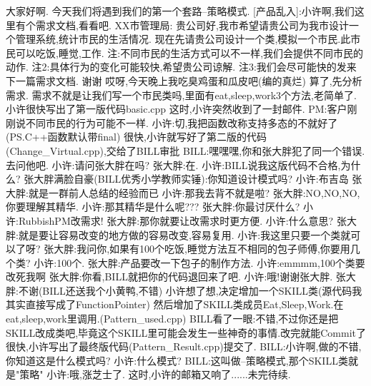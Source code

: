 \documentclass{ctexart}
\def\enter{{\hfill\break}}
\begin{document}
\enter
大家好啊.\enter
今天我们将遇到我们的第一个套路--策略模式.\enter
\enter
[产品乱入]:小许啊,我们这里有个需求文档,看看吧.
\enter
XX市管理局:\enter
贵公司好,我市希望请贵公司为我市设计一个管理系统,统计市民的生活情况.\enter
现在先请贵公司设计一个类,模拟一个市民.此市民可以吃饭,睡觉,工作.\enter
注:不同市民的生活方式可以不一样,我们会提供不同市民的动作.\enter
注2:具体行为的变化可能较快,希望贵公司谅解.\enter
注3:我们会尽可能快的发来下一篇需求文档.\enter
\enter
谢谢\enter
\enter
哎呀,今天晚上我吃臭鸡蛋和瓜皮吧(编的真烂)\enter
\enter
算了,先分析需求.\enter
\enter
需求不就是让我们写一个市民类吗,里面有eat,sleep,work3个方法,老简单了.\enter
小许很快写出了第一版代码basic.cpp\enter
\enter
这时,小许突然收到了一封邮件.\enter
\enter
PM:客户刚刚说不同市民的行为可能不一样.\enter
\enter
小许:切,我把函数改称支持多态的不就好了(PS.C++函数默认带final)\enter
很快,小许就写好了第二版的代码(Change\_Virtual.cpp),交给了BILL审批\enter
BILL:嘿嘿嘿,你和张大胖犯了同一个错误.去问他吧.\enter
\enter
小许:请问张大胖在吗?\enter
张大胖:在.\enter
小许:BILL说我这版代码不合格,为什么?\enter
张大胖满脸自豪(BILL优秀小学教师实锤):你知道设计模式吗?\enter
小许:布吉岛\enter
张大胖:就是一群前人总结的经验而已\enter
小许:那我去背不就是啦?\enter
张大胖:NO,NO,NO,你要理解其精华.\enter
小许:那其精华是什么呢???\enter
张大胖:你最讨厌什么?\enter
小许:RubbishPM改需求!\enter
张大胖:那你就要让改需求时更方便.\enter
小许:什么意思?\enter
张大胖:就是要让容易改变的地方做的容易改变,容易复用.\enter
小许:我这里只要一个类就可以了呀?\enter
张大胖:我问你,如果有100个吃饭,睡觉方法互不相同的包子师傅,你要用几个类?\enter
小许:100个.\enter
张大胖:产品要改一下包子的制作方法.\enter
小许:emmmm,100个类要改死我啊\enter
张大胖:你看,BILL就把你的代码退回来了吧.\enter
小许:哦!谢谢张大胖.\enter
张大胖:不谢(BILL还送我个小黄鸭,不错)\enter
\enter
小许想了想,决定增加一个SKILL类(源代码我其实直接写成了FunctionPointer)\enter
然后增加了SKILL类成员Eat,Sleep,Work.在eat,sleep,work里调用.(Pattern\_used.cpp)\enter
BILL看了一眼:不错,不过你还是把SKILL改成类吧,毕竟这个SKILL里可能会发生一些神奇的事情.改完就能Commit了\enter
很快,小许写出了最终版代码(Pattern\_Result.cpp)提交了.\enter
BILL:小许啊,做的不错,你知道这是什么模式吗?\enter
小许:什么模式?\enter
BILL:这叫做--策略模式,那个SKILL类就是"策略"\enter
小许:哦,涨芝士了.\enter
这时,小许的邮箱又响了......未完待续.\enter
\end{document}
